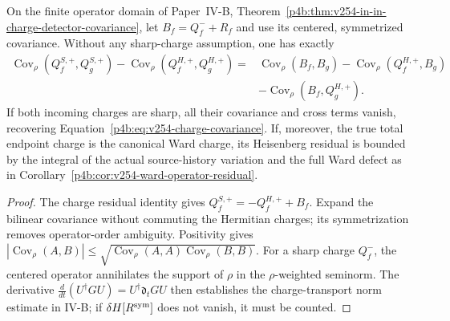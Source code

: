 \documentclass[12pt,a4paper]{article}
\begin{document}
\begin{proposition}
\label{p4c:prop:v254-nonsharp-ward-covariance}
On the finite operator domain of Paper~IV-B,
Theorem~\ref{p4b:thm:v254-in-in-charge-detector-covariance},
let $B_f=Q^-_f+R_f$ and use its centered, symmetrized covariance.
Without any sharp-charge assumption, one has exactly
\begin{align*}
\operatorname{Cov}_\rho(Q^{S,+}_f,Q^{S,+}_g)
-\operatorname{Cov}_\rho(Q^{H,+}_f,Q^{H,+}_g)
={}&\operatorname{Cov}_\rho(B_f,B_g)
-\operatorname{Cov}_\rho(Q^{H,+}_f,B_g)\\
&-\operatorname{Cov}_\rho(B_f,Q^{H,+}_g).
\end{align*}
If both incoming charges are sharp, all their covariance and cross
terms vanish, recovering Equation~\eqref{p4b:eq:v254-charge-covariance}.
If, moreover, the true total endpoint charge is the canonical Ward
charge, its Heisenberg residual is bounded by the integral of the
actual source-history variation and the full Ward defect as in
Corollary~\ref{p4b:cor:v254-ward-operator-residual}.
\end{proposition}
\begin{proof}
The charge residual identity gives
$Q^{S,+}_f=-Q^{H,+}_f+B_f$. Expand the bilinear covariance
without commuting the Hermitian charges; its symmetrization removes
operator-order ambiguity. Positivity gives
$|\operatorname{Cov}_\rho(A,B)|\le
\sqrt{\operatorname{Cov}_\rho(A,A)\operatorname{Cov}_\rho(B,B)}$.
For a sharp charge $Q^-_f$, the centered operator annihilates the
support of $\rho$ in the $\rho$-weighted seminorm. The derivative
$\frac d{dt}(U^\dagger GU)=U^\dagger\mathfrak d_tG U$
then establishes the charge-transport norm estimate in IV-B;
if $\delta H[R^{\rm sym}]$ does not vanish, it must be counted.
\end{proof}
\end{document}
